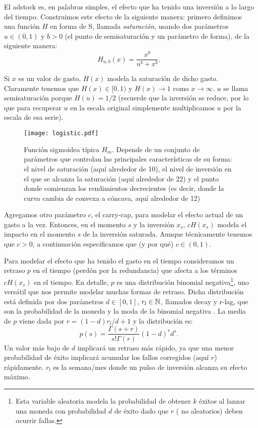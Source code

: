 El adstock es, en palabras simples, el efecto que ha tenido una inversión a lo largo del tiempo. Construimos este efecto de la siguiente manera: primero definimos una función \(H\) en forma de S, llamada \textit{saturación}, usando dos parámetros \(u \in (0,1)\) y \(b > 0 \) (el punto de semisaturación y un parámetro de forma), de la siguiente manera:
\[ H_{ u,b }(x) = \frac{ x^b }{ u^b + x^b }. \]

Si \(x\) es un valor de gasto, \(H(x)\) modela la saturación de dicho gasto. Claramente tenemos que \( H(x) \in [0,1) \) y \(H(x) \to 1\) como \(x \to \infty\). \(u\) se llama semisaturación porque \(H(u) = 1/2\) (recuerde que la inversión se reduce, por lo que para recuperar \(u\) en la escala original simplemente multiplicamos \(u\) por la escala de esa serie).

\begin{figure}
	\centering
	\texttt{[image: logistic.pdf]}
	\caption{Función sigmoidea típica \(H_m\). Depende de un conjunto de parámetros que controlan las principales características de su forma: el nivel de saturación (aquí alrededor de 10), el nivel de inversión en el que se alcanza la saturación (aquí alrededor de 22) y el punto donde comienzan los rendimientos decrecientes (es decir, donde la curva cambia de convexa a cóncava, aquí alrededor de 12)}
	\label{logística}
\end{figure}

Agregamos otro parámetro \(c\), el carry-cap, para modelar el efecto actual de un gasto a la vez. Entonces, en el momento \(s\) y la inversión \(x_s\), \(cH(x_s)\) modela el impacto en el momento \(s\) de la inversión saturada. Aunque técnicamente tenemos que \(c > 0\), a continuación especificamos que (y por qué) \(c \in (0,1)\).

Para modelar el efecto que ha tenido el gasto en el tiempo consideramos un retraso \(p\) en el tiempo (perdón por la redundancia) que afecta a los términos \(cH(x_s)\) en el tiempo. En detalle, \(p\) es una distribución binomial negativa\footnote{Esta variable aleatoria modela la probabilidad de obtener \(k\) éxitos al lanzar una moneda con probabilidad \(d\) de éxito dado que \(r\) ( no aleatorios) deben ocurrir fallas.}, uno versátil que nos permite modelar muchas formas de retraso. Dicha distribución está definida por dos parámetros \(d \in [0,1]\), \(r_l \in \mathbb{N}\), llamados decay y r-lag, que son la probabilidad de la moneda y la moda de la binomial negativa . La media de \(p\) viene dada por \(r = (1 - d) r_l / d + 1 \) y la distribución es:
\[ p(s) = \frac{ \Gamma(s + r) }{ s! \Gamma(r) } (1 - d)^{r} d^s. \]
Un valor más bajo de \(d\) implicará un retraso más rápido, ya que una menor probabilidad de éxito implicará acumular los fallos corregidos (aquí \(r\)) rápidamente. $r_l$ es la semana/mes donde un pulso de inversión alcanza su efecto máximo.


